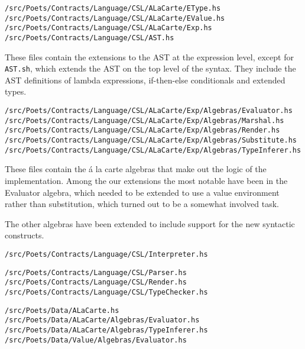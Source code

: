 \documentclass[10pt,a4paper,final,oneside,openany,article]{memoir}
\begin{document}

\begin{verbatim}
/src/Poets/Contracts/Language/CSL/ALaCarte/EType.hs
/src/Poets/Contracts/Language/CSL/ALaCarte/EValue.hs
/src/Poets/Contracts/Language/CSL/ALaCarte/Exp.hs
/src/Poets/Contracts/Language/CSL/AST.hs
\end{verbatim}

These files contain the extensions to the AST at the expression level,
except for \verb+AST.sh+, which extends the AST on the top level of
the syntax.  They include the AST definitions of lambda expressions,
if-then-else conditionals and extended types.

\begin{verbatim}
/src/Poets/Contracts/Language/CSL/ALaCarte/Exp/Algebras/Evaluator.hs
/src/Poets/Contracts/Language/CSL/ALaCarte/Exp/Algebras/Marshal.hs
/src/Poets/Contracts/Language/CSL/ALaCarte/Exp/Algebras/Render.hs
/src/Poets/Contracts/Language/CSL/ALaCarte/Exp/Algebras/Substitute.hs
/src/Poets/Contracts/Language/CSL/ALaCarte/Exp/Algebras/TypeInferer.hs
\end{verbatim}

These files contain the á la carte algebras that make out the logic of the implementation.
Among the our extensions the most notable have been in the Evaluator
algebra, which needed to be extended to use a value environment rather
than substitution, which turned out to be a somewhat involved task.

The other algebras have been extended to include support for the new
syntactic constructs.



\begin{verbatim}
/src/Poets/Contracts/Language/CSL/Interpreter.hs
\end{verbatim}



\begin{verbatim}
/src/Poets/Contracts/Language/CSL/Parser.hs
/src/Poets/Contracts/Language/CSL/Render.hs
/src/Poets/Contracts/Language/CSL/TypeChecker.hs
\end{verbatim}


\begin{verbatim}
/src/Poets/Data/ALaCarte.hs
/src/Poets/Data/ALaCarte/Algebras/Evaluator.hs
/src/Poets/Data/ALaCarte/Algebras/TypeInferer.hs
/src/Poets/Data/Value/Algebras/Evaluator.hs
\end{verbatim}
\end{document}
